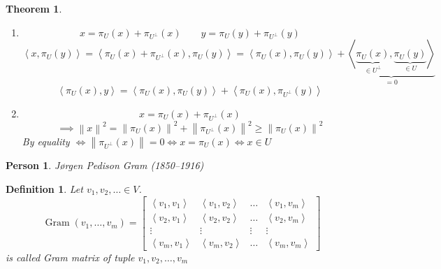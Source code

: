 \documentclass{article}
\newcounter{lecref}[section]
\numberwithin{lecref}{section}
\newtheorem{theorem}[lecref]{Theorem}
\newtheorem{definition}[lecref]{Definition}
\newtheorem*{person}{Person}
\newcommand{\ip}[2]{\left\langle#1,#2\right\rangle} %
\newcommand{\norm}[1]{\left\|#1\right\|}
\begin{document}
\begin{theorem}
\begin{enumerate}
\begin{enumerate}
          \item
            \[ x = \pi_U(x) + \pi_{U^\bot}(x) \qquad y = \pi_U(y) + \pi_{U^\bot}(y) \]
            \[ \ip{x}{\pi_U(y)} = \ip{\pi_U(x) + \pi_{U^\bot}(x)}{\pi_U(y)} = \ip{\pi_U(x)}{\pi_U(y)} + \underbrace{\ip{\underbrace{\pi_U(x)}_{\in U^\bot}}{\underbrace{\pi_U(y)}_{\in U}}}_{= 0} \]
            \[ \ip{\pi_U(x)}{y} = \ip{\pi_U(x)}{\pi_U(y)} + \ip{\pi_U(x)}{\pi_{U^\bot}(y)} \]
          \item
            \[ x = \pi_U(x) + \pi_{U^\bot}(x) \]
            \[ \implies \norm{x}^2 = \norm{\pi_U(x)}^2 + \norm{\pi_{U^\bot}(x)}^2 \geq \norm{\pi_U(x)}^2 \]
            By equality $\iff \norm{\pi_{U^\bot}(x)} = 0 \iff x = \pi_U(x) \iff x \in U$
        \end{enumerate}
  \end{enumerate}
\end{theorem}

\begin{person}
  J{\o}rgen Pedison Gram (1850--1916)
\end{person}

\begin{definition} %
  Let $v_1, v_2, \ldots \in V$.
  \[
    \operatorname{Gram}(v_1, \ldots, v_m) = \begin{bmatrix}
      \ip{v_1}{v_1} & \ip{v_1}{v_2} & \ldots & \ip{v_1}{v_m} \\ 
      \ip{v_2}{v_1} & \ip{v_2}{v_2} & \ldots & \ip{v_2}{v_m} \\ 
      \vdots & \vdots & \vdots & \vdots \\
      \ip{v_m}{v_1} & \ip{v_m}{v_2} & \ldots & \ip{v_m}{v_m}
    \end{bmatrix}
  \]
  is called \emph{Gram matrix of tuple $v_1, v_2, \ldots, v_m$}
\end{definition}
\end{document}
